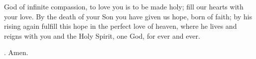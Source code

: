 \lettrine[lines=3]{G}{}od of infinite compassion,
to love you is to be made holy;
fill our hearts with your love.
By the death of your Son
you have given us hope, born of faith;
by his rising again
fulfill this hope
in the perfect love of heaven,
where he lives and reigns with you and the Holy Spirit,
one God, for ever and ever. \par \Rbar. Amen.